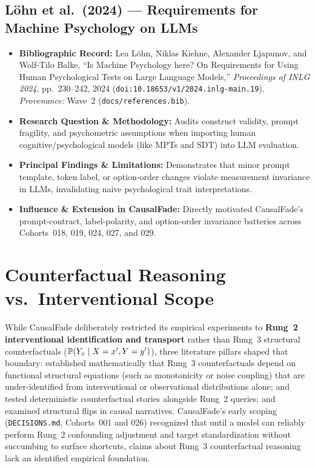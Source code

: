 \subsection{L{\"o}hn et al.\ (2024) --- Requirements for Machine Psychology on LLMs \citep{lohn2024machinepsychology}}
\begin{itemize}
  \item \textbf{Bibliographic Record:} Lea L{\"o}hn, Niklas Kiehne, Alexander Ljapunov, and Wolf-Tilo Balke, ``Is Machine Psychology here? On Requirements for Using Human Psychological Tests on Large Language Models,'' \emph{Proceedings of INLG 2024}, pp.~230--242, 2024 (\texttt{doi:10.18653/v1/2024.inlg-main.19}). \emph{Provenance:} Wave~2 (\texttt{docs/references.bib}).
  \item \textbf{Research Question \& Methodology:} Audits construct validity, prompt fragility, and psychometric assumptions when importing human cognitive/psychological models (like MPTs and SDT) into LLM evaluation.
  \item \textbf{Principal Findings \& Limitations:} Demonstrates that minor prompt template, token label, or option-order changes violate measurement invariance in LLMs, invalidating naive psychological trait interpretations.
  \item \textbf{Influence \& Extension in CausalFade:} Directly motivated CausalFade's prompt-contract, label-polarity, and option-order invariance batteries across Cohorts~018, 019, 024, 027, and 029.
\end{itemize}

\section{Counterfactual Reasoning vs.\ Interventional Scope}

While CausalFade deliberately restricted its empirical experiments to \textbf{Rung~2 interventional identification and transport} rather than Rung~3 structural counterfactuals ($\mathbb{P}(Y_{x}\mid X=x', Y=y')$), three literature pillars shaped that boundary: \citet{pearl2009causality} established mathematically that Rung~3 counterfactuals depend on functional structural equations (such as monotonicity or noise coupling) that are under-identified from interventional or observational distributions alone; \citet{jin2023cladder} and \citet{nwaiwu2025compressed} tested deterministic counterfactual stories alongside Rung~2 queries; and \citet{wang2026causalflip} examined structural flips in causal narratives. CausalFade's early scoping (\texttt{DECISIONS.md}, Cohorts~001 and 026) recognized that until a model can reliably perform Rung~2 confounding adjustment and target standardization without succumbing to surface shortcuts, claims about Rung~3 counterfactual reasoning lack an identified empirical foundation.


